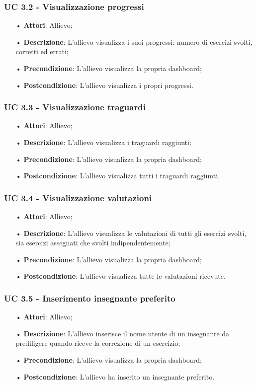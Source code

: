 \subsubsection{UC 3.2 - Visualizzazione progressi}
\begin{itemize}
\item[•]\textbf{Attori}: Allievo;
\item[•]\textbf{Descrizione}: L'allievo visualizza i suoi progressi: numero di esercizi svolti, corretti ed errati;
\item[•]\textbf{Precondizione}: L'allievo visualizza la propria dashboard;
\item[•]\textbf{Postcondizione}: L'allievo visualizza i propri progressi.
\end{itemize}

\subsubsection{UC 3.3 - Visualizzazione traguardi}
\begin{itemize}
\item[•]\textbf{Attori}: Allievo;
\item[•]\textbf{Descrizione}: L'allievo visualizza i traguardi raggiunti;
\item[•]\textbf{Precondizione}: L'allievo visualizza la propria dashboard;
\item[•]\textbf{Postcondizione}: L'allievo visualizza tutti i traguardi raggiunti.
\end{itemize}

\subsubsection{UC 3.4 - Visualizzazione valutazioni}
\begin{itemize}
\item[•]\textbf{Attori}: Allievo;
\item[•]\textbf{Descrizione}: L'allievo visualizza le valutazioni di tutti gli esercizi svolti, sia esercizi assegnati che svolti indipendentemente;
\item[•]\textbf{Precondizione}: L'allievo visualizza la propria dashboard;
\item[•]\textbf{Postcondizione}: L'allievo visualizza tutte le valutazioni ricevute.
\end{itemize}

\subsubsection{UC 3.5 - Inserimento insegnante preferito}
\begin{itemize}
\item[•]\textbf{Attori}: Allievo;
\item[•]\textbf{Descrizione}: L'allievo inserisce il nome utente di un insegnante da prediligere quando riceve la correzione di un esercizio;
\item[•]\textbf{Precondizione}: L'allievo visualizza la propria dashboard;
\item[•]\textbf{Postcondizione}: L'allievo ha inserito un insegnante preferito.
\end{itemize}

